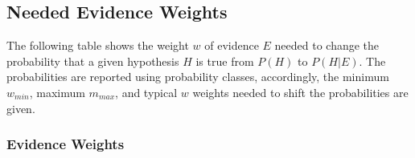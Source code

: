 \documentclass[
]{article}
\begin{document}
\pagebreak

\subsection{Needed Evidence Weights}\label{needed-evidence-weights}

The following table shows the weight \(w\) of evidence \(E\) needed to
change the probability that a given hypothesis \(H\) is true from
\(P(H)\) to \(P(H|E)\). The probabilities are reported using probability
classes, accordingly, the minimum \(w_{min}\), maximum \(m_{max}\), and
typical \(w\) weights needed to shift the probabilities are given.

\subsubsection{Evidence Weights}\label{evidence-weights-3}
\end{document}
